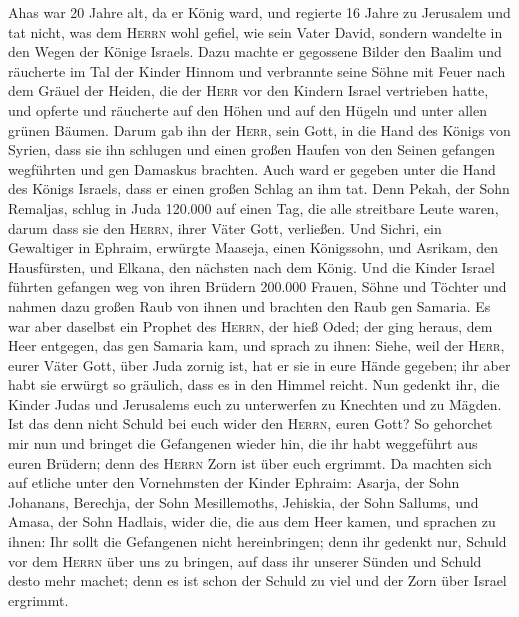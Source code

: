  Ahas war 20 Jahre alt, da er König ward, und regierte 16
Jahre zu Jerusalem und tat nicht, was dem \textsc{Herrn} wohl gefiel,
wie sein Vater David,  sondern wandelte in den Wegen der
Könige Israels. Dazu machte er gegossene Bilder den Baalim
 und räucherte im Tal der Kinder Hinnom und verbrannte
seine Söhne mit Feuer nach dem Gräuel der Heiden, die der \textsc{Herr}
vor den Kindern Israel vertrieben hatte,  und opferte und
räucherte auf den Höhen und auf den Hügeln und unter allen grünen
Bäumen.  Darum gab ihn der \textsc{Herr}, sein Gott, in
die Hand des Königs von Syrien, dass sie ihn schlugen und einen großen
Haufen von den Seinen gefangen wegführten und gen Damaskus brachten.
Auch ward er gegeben unter die Hand des Königs Israels, dass er einen
großen Schlag an ihm tat.  Denn Pekah, der Sohn Remaljas,
schlug in Juda 120.000 auf einen Tag, die alle streitbare Leute waren,
darum dass sie den \textsc{Herrn}, ihrer Väter Gott, verließen.
 Und Sichri, ein Gewaltiger in Ephraim, erwürgte Maaseja,
einen Königssohn, und Asrikam, den Hausfürsten, und Elkana, den nächsten
nach dem König.  Und die Kinder Israel führten gefangen
weg von ihren Brüdern 200.000 Frauen, Söhne und Töchter und nahmen dazu
großen Raub von ihnen und brachten den Raub gen Samaria. 
Es war aber daselbst ein Prophet des \textsc{Herrn}, der hieß Oded; der
ging heraus, dem Heer entgegen, das gen Samaria kam, und sprach zu
ihnen: Siehe, weil der \textsc{Herr}, eurer Väter Gott, über Juda zornig
ist, hat er sie in eure Hände gegeben; ihr aber habt sie erwürgt so
gräulich, dass es in den Himmel reicht.  Nun gedenkt ihr,
die Kinder Judas und Jerusalems euch zu unterwerfen zu Knechten und zu
Mägden. Ist das denn nicht Schuld bei euch wider den \textsc{Herrn},
euren Gott?  So gehorchet mir nun und bringet die
Gefangenen wieder hin, die ihr habt weggeführt aus euren Brüdern; denn
des \textsc{Herrn} Zorn ist über euch ergrimmt.  Da
machten sich auf etliche unter den Vornehmsten der Kinder Ephraim:
Asarja, der Sohn Johanans, Berechja, der Sohn Mesillemoths, Jehiskia,
der Sohn Sallums, und Amasa, der Sohn Hadlais, wider die, die aus dem
Heer kamen,  und sprachen zu ihnen: Ihr sollt die
Gefangenen nicht hereinbringen; denn ihr gedenkt nur, Schuld vor dem
\textsc{Herrn} über uns zu bringen, auf dass ihr unserer Sünden und
Schuld desto mehr machet; denn es ist schon der Schuld zu viel und der
Zorn über Israel ergrimmt.

